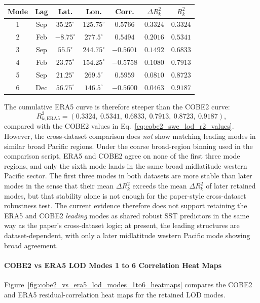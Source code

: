 \documentclass[11pt]{article}
\begin{document}
\begin{center}
\begin{tabular}{ccccccc}
\hline
Mode & Lag & Lat. & Lon. & Corr. & $\Delta R_k^2$ & $R_k^2$ \\
\hline
1 & Sep & $35.25^\circ$ & $125.75^\circ$ & $0.5766$ & $0.3324$ & $0.3324$ \\
2 & Feb & $-8.75^\circ$ & $277.5^\circ$ & $0.5494$ & $0.2016$ & $0.5341$ \\
3 & Sep & $55.5^\circ$ & $244.75^\circ$ & $-0.5601$ & $0.1492$ & $0.6833$ \\
4 & Feb & $23.75^\circ$ & $154.25^\circ$ & $-0.5758$ & $0.1080$ & $0.7913$ \\
5 & Sep & $21.25^\circ$ & $269.5^\circ$ & $0.5959$ & $0.0810$ & $0.8723$ \\
6 & Dec & $56.75^\circ$ & $146.5^\circ$ & $-0.5600$ & $0.0463$ & $0.9187$ \\
\hline
\end{tabular}
\end{center}
The cumulative ERA5 curve is therefore steeper than the COBE2 curve:
\begin{equation}
R_{k,\mathrm{ERA5}}^2=(0.3324,\ 0.5341,\ 0.6833,\ 0.7913,\ 0.8723,\ 0.9187),
\end{equation}
compared with the COBE2 values in Eq.~\eqref{eq:cobe2_swe_lod_r2_values}. However, the cross-dataset
comparison does \emph{not} show matching leading modes in similar broad Pacific regions. Under the
coarse broad-region binning used in the comparison script, ERA5 and COBE2 agree on none of the
first three mode regions, and only the sixth mode lands in the same broad midlatitude western
Pacific sector. The first three modes in both datasets are more stable than later modes in the
sense that their mean $\Delta R_k^2$ exceeds the mean $\Delta R_k^2$ of later retained modes, but
that stability alone is not enough for the paper-style cross-dataset robustness test. The current
evidence therefore does not support retaining the ERA5 and COBE2 \emph{leading} modes as shared
robust SST predictors in the same way as the paper's cross-dataset logic; at present, the leading
structures are dataset-dependent, with only a later midlatitude western Pacific mode showing broad
agreement.



\paragraph{COBE2 vs ERA5 LOD Modes 1 to 6 Correlation Heat Maps}
Figure~\ref{fig:cobe2_vs_era5_lod_modes_1to6_heatmaps} compares the COBE2 and ERA5 residual-correlation heat maps for the retained LOD modes.
\end{document}
